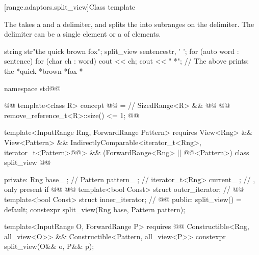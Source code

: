 {[range.adaptors.split_view]{Class template }

\pnum
The  takes a   and a
delimiter, and splits the   into
subranges on the delimiter. The delimiter can be a single element or a
  of elements.

\pnum
\begin{example}
\begin{codeblock}
string str{"the quick brown fox"};
split_view sentence{str, ' '};
for (auto word : sentence) {
  for (char ch : word)
    cout << ch;
  cout << " *";
}
// The above prints: the *quick *brown *fox *
\end{codeblock}
\end{example}

\begin{codeblock}
namespace std@@ { @@
  template<class R>
  concept @@ = // \expos
    SizedRange<R> && @@
      @@ remove_reference_t<R>::size() <= 1;
    @\oldtxt{\};}@

  template<InputRange Rng, ForwardRange Pattern>
    requires View<Rng> && View<Pattern> &&
      IndirectlyComparable<iterator_t<Rng>, iterator_t<Pattern>@@> &&
      (ForwardRange<Rng> || @@<Pattern>)
  class split_view @@ {
  private:
    Rng base_ {};                               // \expos
    Pattern pattern_ {};                        // \expos
    iterator_t<Rng> current_ {};                // \expos, only present if 
    @@                         @@
    template<bool Const> struct outer_iterator; // \expos
    @@
    template<bool Const> struct inner_iterator; // \expos
    @@
  public:
    split_view() = default;
    constexpr split_view(Rng base, Pattern pattern);

    template<InputRange O, ForwardRange P>
      requires @@
        Constructible<Rng, all_view<O>> &&
        Constructible<Pattern, all_view<P>>
    constexpr split_view(O&& o, P&& p);

}}
\end{codeblock}}

